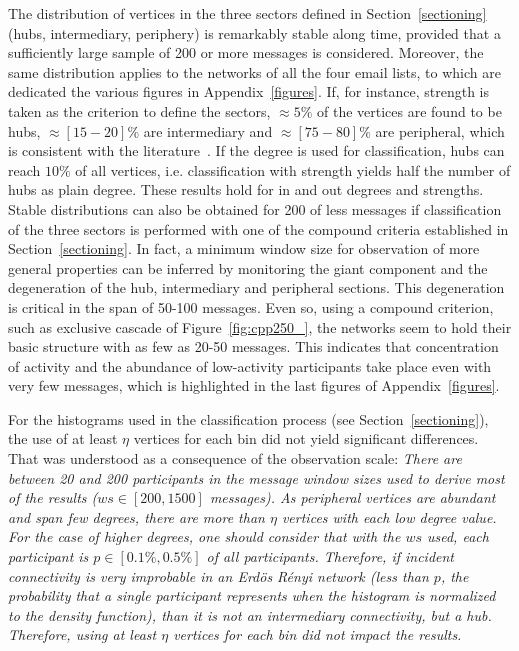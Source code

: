 \documentclass[%
 aip,
 jmp,%
 amsmath,amssymb,
 reprint,%
]{revtex4-1}
\begin{document}
The distribution of vertices in the three sectors defined in Section~\ref{sectioning} (hubs, intermediary, periphery) is remarkably stable along time, provided that a sufficiently large sample of 200 or more messages is considered. Moreover, the same distribution applies to the networks of all the four email lists, to which are dedicated the various figures in Appendix~\ref{figures}. If, for instance, strength is taken as the criterion to define the sectors, $\approx 5\%$ of the vertices are found to be hubs, $\approx [15-20]\%$ are intermediary and $\approx [75-80]\%$ are peripheral, which is consistent with the literature~\cite{secFree}. If the degree is used for classification, hubs can reach $10\%$ of all vertices, i.e. classification with strength yields half the number of hubs as plain degree. These results hold for in and out degrees and strengths. Stable distributions can also be obtained for 200 of less messages if classification of the three sectors is performed with one of the compound criteria established in Section~\ref{sectioning}. In fact, a minimum window size for observation of more general properties can be inferred by monitoring the giant component and the degeneration of the hub, intermediary and peripheral sections. This degeneration is critical in the span of 50-100 messages. Even so, using a compound criterion, such as exclusive cascade of Figure~\ref{fig:cpp250_}, the networks seem to hold their basic structure with as few as 20-50 messages. This indicates that concentration of activity and the abundance of low-activity participants take place even with very few messages, which is highlighted in the last figures of Appendix~\ref{figures}.

For the histograms used in the classification process (see Section~\ref{sectioning}), the use of at least $\eta$ vertices for each bin did not yield significant differences.
That was understood as a consequence of the observation scale:
\emph{There are between 20 and 200 participants in the message window sizes used to derive most of the results ($ws \in [200,1500]$ messages). As peripheral vertices are abundant and span few degrees, there are more than $\eta$ vertices with each low degree value. For the case of higher degrees, one should consider that with the $ws$ used, each participant is $p \in [0.1\%,0.5\%]$ of all participants. Therefore, if incident connectivity is very improbable in an Erd\"os R\'enyi network (less than $p$, the probability that a single participant represents when the histogram is normalized to the density function), than it is not an intermediary connectivity, but a hub. Therefore, using at least $\eta$ vertices for each bin did not impact the results.}
\end{document}
